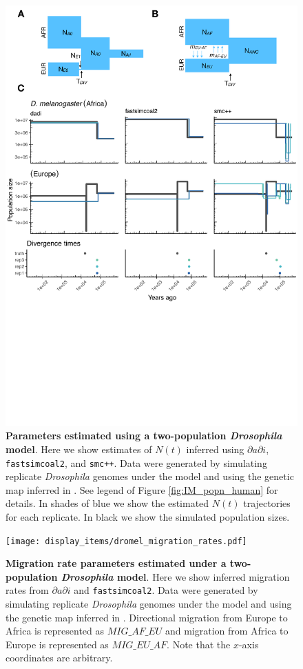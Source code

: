 \documentclass[12pt,halfline,a4paper]{ouparticle}
\newcommand{\dadi}{$\partial a \partial i$\xspace}
\newcommand{\smcpp}{\texttt{smc++}\xspace}
\newcommand{\fastsimcoal}{\texttt{fastsimcoal2}\xspace}
\begin{document}
\begin{figure}
\begin{center}
\includegraphics[width=0.8\linewidth]{display_items/d_mel_two_popn_comp.pdf}
\caption{\textbf{Parameters estimated using a two-population \emph{Drosophila} model}.
Here we show estimates of $N(t)$ inferred using \dadi, \fastsimcoal, and \smcpp.
Data were generated by simulating
replicate \emph{Drosophila} genomes under the \cite{li2006inferring} model and using the genetic map
inferred in \cite{comeron2012many}. See legend of Figure \ref{fig:IM_popn_human} for details.
In shades of blue we show the estimated
$N(t)$ trajectories for each replicate. In black we show the simulated population sizes.}
\label{fig:two_popn_fly}
\end{center}
\end{figure}


\begin{figure}
\begin{center}
\texttt{[image: display\_items/dromel\_migration\_rates.pdf]}
\caption{\textbf{Migration rate parameters estimated under a two-population \emph{Drosophila} model}.
Here we show inferred migration rates from \dadi and \fastsimcoal.
Data were generated by simulating replicate \emph{Drosophila} genomes under the \cite{li2006inferring} model and using the genetic map
inferred in \cite{comeron2012many}.
Directional migration from Europe to Africa is represented as $MIG\_AF\_EU$ and
migration from Africa to Europe is represented as $MIG\_EU\_AF$.
Note that the $x$-axis coordinates are arbitrary.}
\label{fig:dromel_mig_rates}
\end{center}
\end{figure}
\end{document}
